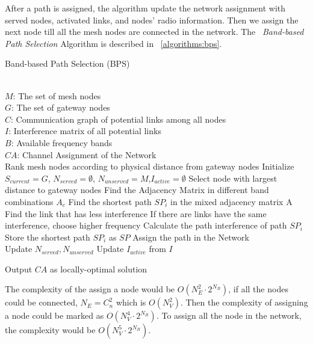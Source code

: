 After a path is assigned, the algorithm update the network assignment with served nodes, activated links, and nodes' radio information. Then we assign the next node till all the mesh nodes are connected in the network.
The ~\emph{Band-based Path Selection} Algorithm is described in ~\ref{algorithms:bps}.

\begin{algorithm}
    \small
\caption{Band-based Path Selection (BPS)}
\label{algorithms:bps}
\begin{algorithmic}[1]
\REQUIRE  ~~\\
	$M$: The set of mesh nodes\\
	$G$: The set of gateway nodes\\
	$C$: Communication graph of potential links among all nodes\\
	$I$: Interference matrix of all potential links \\
	$B$: Available frequency bands
\ENSURE ~~\\    
$CA$: Channel Assignment of the Network\\
\STATE Rank mesh nodes according to physical distance from gateway nodes
\STATE Initialize $S_{current}=G$, $N_{served}=\emptyset$, $N_{unserved}=M$,$I_{active}=\emptyset$
\STATE Select node with largest distance to gateway nodes
\STATE Find the Adjacency Matrix in different band combinations $A_c$
\STATE Find the shortest path $SP_i$ in the mixed adjacency matrix A 
\STATE Find the link that has less interference
\STATE If there are links have the same interference, choose higher frequency
\STATE Calculate the path interference of path $SP_i$
\ENDFOR
\STATE Store the shortest path $SP_i$ as $SP$
\ENDFOR
\STATE Assign the path in the Network\\
		\STATE Update $N_{served},N_{unserved}$
		\STATE Update $I_{active}$ from $I$
\ENDWHILE 

Output $CA$ as locally-optimal solution\\
\end{algorithmic}
\end{algorithm}

The complexity of the assign a node would be $O(N_E^2\cdot2^{N_B})$, if all the nodes could be connected, $N_E=C_n^2$ which is $O(N_V^2)$.
Then the complexity of assigning a node could be marked as $O(N_V^4\cdot2^{N_B})$.
 To assign all the node in the network, the complexity would be $O(N_V^5\cdot2^{N_B})$.


